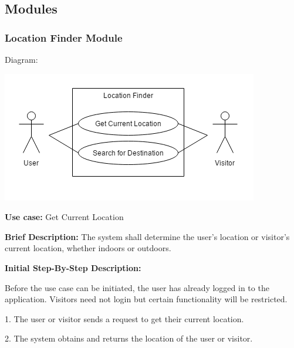 ﻿\documentclass{article}
\begin{document}
    \subsection{Modules}
    \subsubsection{Location Finder Module}
    Diagram:
    	
    \includegraphics[scale=.7]{LocationFinder}
    \begin{flushleft}
    \textbf{Use case:} Get Current Location
    \newline
    	
    \textbf{Brief Description:}
    \newline
    The system shall determine the user's location or visitor's 		current location, whether indoors or outdoors.
    \newline
    
    \textbf{Initial Step-By-Step Description:}
    
    Before the use case can be initiated, the user has already logged in to the application. Visitors need not login but certain functionality will be restricted.
	\newline    
	
1. The user or visitor sends a request to get their current location.
    
2. The system obtains and returns the location of the user or visitor.
\end{flushleft}
\end{document}
